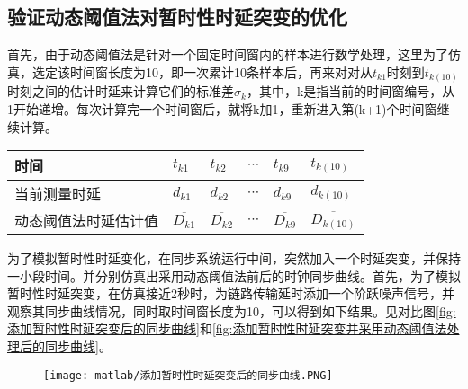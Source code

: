 \subsection{验证动态阈值法对暂时性时延突变的优化}
首先，由于动态阈值法是针对一个固定时间窗内的样本进行数学处理，这里为了仿真，选定该时间窗长度为10，即一次累计10条样本后，再来对对从$t_{k1}$时刻到$t_{k(10)}$时刻之间的估计时延来计算它们的标准差$\sigma_{k}$，其中，k是指当前的时间窗编号，从1开始递增。每次计算完一个时间窗后，就将k加1，重新进入第(k+1)个时间窗继续计算。
\begin{table}[!hpb]
  \centering
  \begin{tabular}{llllll} \toprule
    时间 & $t_{k1}$ & $t_{k2}$ & $\cdots$ & $t_{k9}$ & $t_{k(10)}$ \\ \midrule
    当前测量时延 & $d_{k1}$ & $d_{k2}$ & $\cdots$ & $d_{k9}$ & $d_{k(10)}$ \\ \midrule
    动态阈值法时延估计值 & $\overline{D_{k1}}$ & $\overline{D_{k2}}$ & $\cdots$ & $\overline{D_{k9}}$ & $\overline{D_{k(10)}}$  \\ \bottomrule
  \end{tabular}
\end{table}

为了模拟暂时性时延变化，在同步系统运行中间，突然加入一个时延突变，并保持一小段时间。并分别仿真出采用动态阈值法前后的时钟同步曲线。首先，为了模拟暂时性时延突变，在仿真接近2秒时，为链路传输延时添加一个阶跃噪声信号，并观察其同步曲线情况，同时取时间窗长度为10，可以得到如下结果。见对比图\ref{fig:添加暂时性时延突变后的同步曲线}和\ref{fig:添加暂时性时延突变并采用动态阈值法处理后的同步曲线}。
\begin{figure}[htbp]
  \centering
  \begin{minipage}[b]{1\textwidth}
    \captionstyle{\centering}
    \centering
    \texttt{[image: matlab/添加暂时性时延突变后的同步曲线.PNG]}
  \end{minipage}     
\end{figure}

